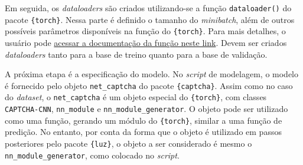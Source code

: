\documentclass[12pt,twoside,brazilian]{book}
\newenvironment{Shaded}{\begin{snugshade}}{\end{snugshade}}
\newcommand{\AttributeTok}[1]{\textcolor[rgb]{0.40,0.45,0.13}{#1}}
\newcommand{\CommentTok}[1]{\textcolor[rgb]{0.37,0.37,0.37}{#1}}
\newcommand{\ConstantTok}[1]{\textcolor[rgb]{0.56,0.35,0.01}{#1}}
\newcommand{\FunctionTok}[1]{\textcolor[rgb]{0.28,0.35,0.67}{#1}}
\newcommand{\NormalTok}[1]{\textcolor[rgb]{0.00,0.23,0.31}{#1}}
\newcommand{\OtherTok}[1]{\textcolor[rgb]{0.00,0.23,0.31}{#1}}
\newcommand{\SpecialCharTok}[1]{\textcolor[rgb]{0.37,0.37,0.37}{#1}}
\begin{document}
\begin{Shaded}
\end{Shaded}

Em seguida, os \emph{dataloaders} são criados utilizando-se a função
\texttt{dataloader()} do pacote \texttt{\{torch\}}. Nessa parte é
definido o tamanho do \emph{minibatch}, além de outros possíveis
parâmetros disponíveis na função do \texttt{\{torch\}}. Para mais
detalhes, o usuário pode
\href{https://torch.mlverse.org/docs/reference/dataloader.html}{acessar
a documentação da função neste link}. Devem ser criados
\emph{dataloaders} tanto para a base de treino quanto para a base de
validação.

\begin{Shaded}
\end{Shaded}

A próxima etapa é a especificação do modelo. No \emph{script} de
modelagem, o modelo é fornecido pelo objeto \texttt{net\_captcha} do
pacote \texttt{\{captcha\}}. Assim como no caso do \emph{dataset}, o
\texttt{net\_captcha} é um objeto especial do \texttt{\{torch\}}, com
classes \texttt{CAPTCHA-CNN}, \texttt{nn\_module} e
\texttt{nn\_module\_generator}. O objeto pode ser utilizado como uma
função, gerando um módulo do \texttt{\{torch\}}, similar a uma função de
predição. No entanto, por conta da forma que o objeto é utilizado em
passos posteriores pelo pacote \texttt{\{luz\}}, o objeto a ser
considerado é mesmo o \texttt{nn\_module\_generator}, como colocado no
\emph{script}.
\end{document}
